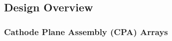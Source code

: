 

\subsection{Design Overview}
\label{sec:fdsp-hv-des}

\subsubsection{Cathode Plane Assembly (CPA) Arrays}
\label{sec:fdsp-hv-des-cpa}

